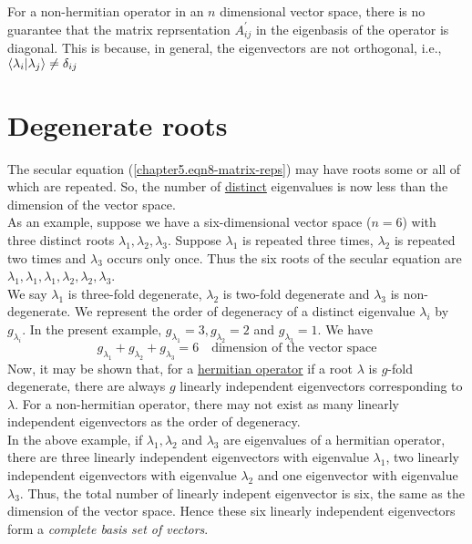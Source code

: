	For a non-hermitian operator in an $n$  dimensional vector space, there is no guarantee that the matrix reprsentation $A_{ij}^\prime$ in the eigenbasis of the operator is diagonal. This is because, in general, the eigenvectors are  not orthogonal, i.e., $\braket{\lambda_i}{\lambda_j} \neq \delta_{ij}$
	
	\section{Degenerate roots}
	The secular equation (\ref{chapter5.eqn8-matrix-reps}) may have roots some or all of which are repeated. So, the number of \underline{distinct} eigenvalues is now less than the dimension of the vector space.\\
	
	As an example, suppose we have a six-dimensional vector space ($n=6$) with three distinct roots $\lambda_1, \lambda_2, \lambda_3$. Suppose $\lambda_1$ is repeated three times, $\lambda_2$ is repeated two times and $\lambda_3$ occurs only once. Thus the six roots of the secular equation are $\lambda_1, \lambda_1, \lambda_1, \lambda_2, \lambda_2, \lambda_3$.\\
	
	We say $\lambda_1$ is three-fold degenerate, $\lambda_2$ is two-fold degenerate and $\lambda_3$ is non-degenerate. We represent the order of degeneracy of a distinct eigenvalue $\lambda_i$ by $g_{\lambda_i}$. In the present example, $g_{\lambda_1}=3, g_{\lambda_2}=2$ and $ g_{\lambda_3}=1$. We have
	\begin{equation}
		g_{\lambda_1} + g_{\lambda_2} + g_{\lambda_3} = 6 \quad \text{dimension of the vector space}
	\end{equation}
	Now, it may be shown that, for a \underline{hermitian operator} if a root $\lambda$ is $g$-fold degenerate, there are always $g$ linearly independent eigenvectors corresponding to $\lambda$. For a non-hermitian operator, there may not exist as many linearly independent eigenvectors as the order of degeneracy.\\
	
	In the above example, if $\lambda_1, \lambda_2$ and $\lambda_3$ are eigenvalues of a hermitian operator, there are three linearly independent eigenvectors with eigenvalue $\lambda_1$, two linearly independent eigenvectors with eigenvalue $\lambda_2$ and one eigenvector with eigenvalue $\lambda_3$. Thus, the total number of linearly indepent eigenvector is six, the same as the dimension of the vector space. Hence these six linearly independent eigenvectors form a \textit{complete basis set of vectors}.\\
	
